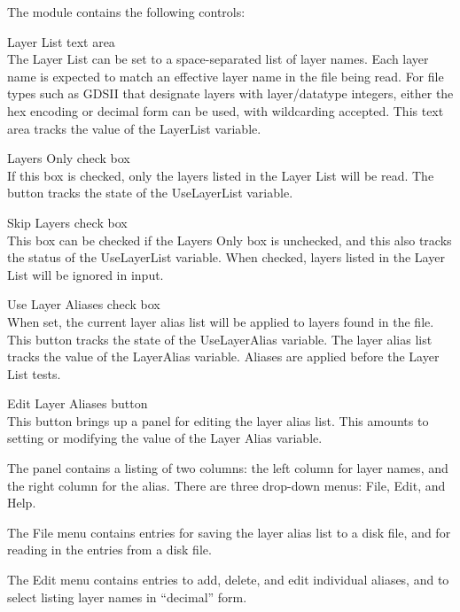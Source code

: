 The module contains the following controls:
\begin{description}
\item{{\cb Layer List} text area}\\
The {\cb Layer List} can be set to a space-separated list of layer
names.  Each layer name is expected to match an effective layer name
in the file being read.  For file types such as GDSII that designate
layers with layer/datatype integers, either the hex encoding or
decimal form can be used, with wildcarding accepted.  This text area
tracks the value of the {\et LayerList} variable.

\item{{\cb Layers Only} check box}\\
If this box is checked, only the layers listed in the {\cb Layer List}
will be read.  The button tracks the state of the {\et UseLayerList}
variable.

\item{{\cb Skip Layers} check box}\\
This box can be checked if the {\cb Layers Only} box is unchecked, and
this also tracks the status of the {\cb UseLayerList} variable.  When
checked, layers listed in the {\cb Layer List} will be ignored in
input.

\item{{\cb Use Layer Aliases} check box}\\
When set, the current layer alias list will be applied to layers
found in the file.  This button tracks the state of the {\et
UseLayerAlias} variable.  The layer alias list tracks the value of
the {\et LayerAlias} variable.  Aliases are applied before the
{\cb Layer List} tests.

\item{{\cb Edit Layer Aliases} button}\\
This button brings up a panel for editing the layer alias list.  This
amounts to setting or modifying the value of the {\et Layer Alias}
variable.

The panel contains a listing of two columns:  the left column for
layer names, and the right column for the alias.  There are three
drop-down menus:  {\cb File}, {\cb Edit}, and {\cb Help}.

The {\cb File} menu contains entries for saving the layer alias list
to a disk file, and for reading in the entries from a disk file.

The {\cb Edit} menu contains entries to add, delete, and edit
individual aliases, and to select listing layer names in ``decimal''
form.


\end{description}
